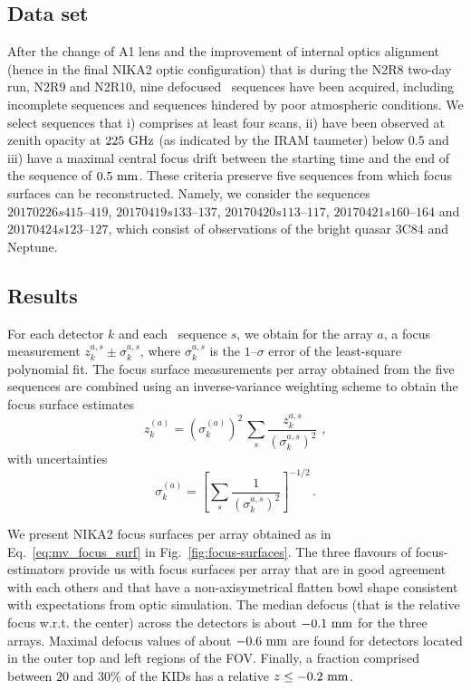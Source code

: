 \subsection{Data set}

After the change of A1 lens and the improvement of internal optics
alignment (hence in the final NIKA2 optic configuration) that is
during the N2R8 two-day run, N2R9 and N2R10,   
nine defocused \bm\ sequences have been acquired, including incomplete
sequences and sequences hindered by poor atmospheric conditions.
We select sequences that i) comprises at least four scans, ii) have been
observed at zenith opacity at $225~\rm{GHz}$ (as indicated by
the IRAM taumeter) below 0.5 and iii) have a maximal central focus
drift between the starting time and the end of the sequence of
$0.5~\rm{mm}$. These criteria preserve five sequences from which focus
surfaces can be reconstructed. Namely, we consider the sequences
$20170226s415\mbox{--}419$, $20170419s133\mbox{--}137$, $20170420s113\mbox{--}117$,
$20170421s160\mbox{--}164$ and $20170424s123\mbox{--}127$, which consist of observations
of the bright quasar 3C84 and Neptune.

\subsection{Results}
For each detector $k$ and each \bm\ sequence $s$, we obtain for
the array $a$, a focus measurement $z_k^{a, s} \pm \sigma_k^{a, s}$,
where $\sigma_k^{a, s}$ is the $1\mbox{--}\sigma$ error of the least-square
polynomial fit. The focus surface measurements per array obtained from the five
\bm sequences are combined using an inverse-variance weighting
scheme to obtain the focus surface estimates 
\begin{equation}
\label{eq:mv_focus_surf}
z_k^{(a)} = \left( \sigma_k^{(a)} \right)^2 \,  \sum_s \frac{z_k^{a,s}}{\left(\sigma_k^{a,s}\right)^2}\, \,  ,
\end{equation}
with uncertainties 
\begin{equation}
\label{eq:error_mv_focus_surf}
\sigma_k^{(a)} = \left[ \sum_s \frac{1}{\left(\sigma_k^{a,s}\right)^2}\right]^{-1/2}\, .
\end{equation}


We present NIKA2 focus surfaces per array obtained as in
Eq.~\ref{eq:mv_focus_surf} 
in Fig.~\ref{fig:focus-surfaces}.
The three flavours of focus-estimators provide us with focus surfaces
per array that are in good agreement with each others and that have a
non-axisymetrical flatten bowl shape consistent with expectations from
optic simulation. %
The median defocus (that is the relative focus w.r.t. the center)
across the detectors is about
$-0.1~\rm{mm}$ for the three arrays. Maximal defocus values of about
$-0.6~\rm{mm}$ are found for detectors located in the outer top and
left regions of the FOV. Finally, a fraction comprised between $20$
and $30\%$ of the KIDs has a relative $z\le -0.2~\rm{mm}$.  

